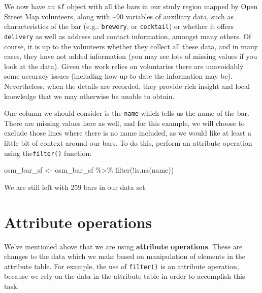 \documentclass[
]{book}
\newenvironment{Shaded}{\begin{snugshade}}{\end{snugshade}}
\newcommand{\FunctionTok}[1]{\textcolor[rgb]{0.00,0.00,0.00}{#1}}
\newcommand{\NormalTok}[1]{#1}
\newcommand{\OtherTok}[1]{\textcolor[rgb]{0.56,0.35,0.01}{#1}}
\newcommand{\SpecialCharTok}[1]{\textcolor[rgb]{0.00,0.00,0.00}{#1}}
\begin{document}
\begin{Shaded}
\end{Shaded}

We now have an \texttt{sf} object with all the bars in our study region mapped by Open Street Map volunteers, along with \textasciitilde90 variables of auxiliary data, such as characteristics of the bar (e.g.: \texttt{brewery}, or \texttt{cocktail}) or whether it offers \texttt{delivery} as well as address and contact information, amongst many others. Of course, it is up to the volunteers whether they collect all these data, and in many cases, they have not added information (you may see lots of missing values if you look at the data). Given the work relies on voluntaries there are unavoidably some accuracy issues (including how up to date the information may be). Nevertheless, when the details are recorded, they provide rich insight and local knowledge that we may otherwise be unable to obtain.

One column we should consider is the \texttt{name} which tells us the name of the bar. There are missing values here as well, and for this example, we will choose to exclude those lines where there is no name included, as we would like at least a little bit of context around our bars. To do this, perform an attribute operation using the\texttt{filter()} function:

\begin{Shaded}
\begin{Highlighting}[]
\NormalTok{osm\_bar\_sf }\OtherTok{\textless{}{-}}\NormalTok{ osm\_bar\_sf }\SpecialCharTok{\%\textgreater{}\%} \FunctionTok{filter}\NormalTok{(}\SpecialCharTok{!}\FunctionTok{is.na}\NormalTok{(name))}
\end{Highlighting}
\end{Shaded}

We are still left with 259 bars in our data set.

\hypertarget{attribute-operations}{%
\section{Attribute operations}\label{attribute-operations}}

We've mentioned above that we are using \textbf{attribute operations}. These are changes to the data which we make based on manipulation of elements in the attribute table. For example, the use of \texttt{filter()} is an attribute operation, because we rely on the data in the attribute table in order to accomplish this task.
\end{document}
